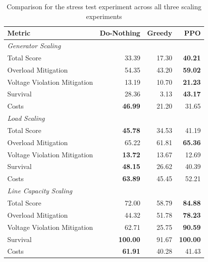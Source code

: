\begin{table}[htbp]
  \centering
  \caption{Comparison for the stress test experiment across all three scaling experiments}
  \label{tab:exp_overview_stress}
  \begin{tabular}{lrrr}
    \toprule
    Metric & Do-Nothing & Greedy & PPO \\
    \midrule
    \multicolumn{4}{l}{\textit{Generator Scaling}} \\
    Total Score & 33.39 & 17.30 & \textbf{40.21} \\
    Overload Mitigation & 54.35 & 43.20 & \textbf{59.02} \\
    Voltage Violation Mitigation & 13.19 & 10.70 & \textbf{21.23} \\
    Survival & 28.36 & 3.13 & \textbf{43.17} \\
    Costs & \textbf{46.99} & 21.20 & 31.65 \\
    \midrule
    \multicolumn{4}{l}{\textit{Load Scaling}} \\
    Total Score & \textbf{45.78} & 34.53 & 41.19 \\
    Overload Mitigation & 65.22 & 61.81 & \textbf{65.36} \\
    Voltage Violation Mitigation & \textbf{13.72} & 13.67 & 12.69 \\
    Survival & \textbf{48.15} & 26.62 & 40.39 \\
    Costs & \textbf{63.89} & 45.45 & 52.21 \\
    \midrule
    \multicolumn{4}{l}{\textit{Line Capacity Scaling}} \\
    Total Score & 72.00 & 58.79 & \textbf{84.88} \\
    Overload Mitigation & 44.32 & 51.78 & \textbf{78.23} \\
    Voltage Violation Mitigation & 62.71 & 25.75 & \textbf{90.59} \\
    Survival & \textbf{100.00} & 91.67 & \textbf{100.00} \\
    Costs & \textbf{61.91} & 40.28 & 41.43 \\
    \bottomrule
  \end{tabular}
\end{table}

